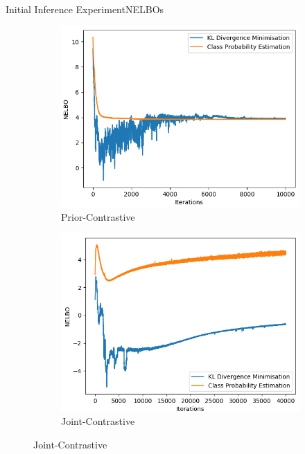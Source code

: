 \documentclass{beamer}
\begin{document}
\begin{frame}{Initial Inference Experiment}{NELBOs}
\begin{figure}
\begin{subfigure}{0.49\textwidth}
\includegraphics[width=\linewidth]{nelbos/PCKLvsPCADV.png}
\caption{Prior-Contrastive}
\end{subfigure}
\begin{subfigure}{0.49\textwidth}
\includegraphics[width=\linewidth]{nelbos/JCKLvsJCADV.png}
\caption{Joint-Contrastive}
\end{subfigure}
\end{figure}
\end{frame}
\end{document}

